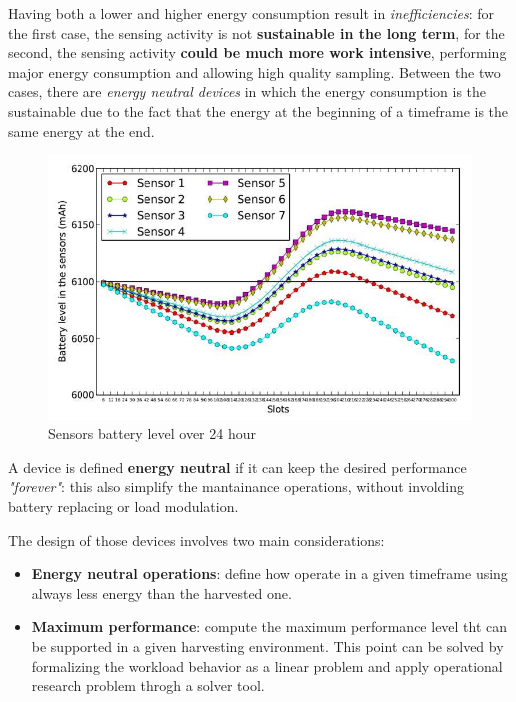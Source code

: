 \documentclass[10pt,a4paper]{report}
\theoremstyle{definition}
\begin{document}
Having both a lower and higher energy consumption result in \textit{inefficiencies}: for the first case, the sensing activity is not \textbf{sustainable in the long term}, for the second, the sensing activity \textbf{could be much more work intensive}, performing major energy consumption and allowing high quality sampling.
Between the two cases, there are \textit{energy neutral devices} in which the energy consumption is the sustainable due to the fact that the energy at the beginning of a timeframe is the same energy at the end.

\begin{figure}[h]
	\centering\includegraphics[scale=0.50]{images/Pasted image 20230509145820.png}
	\caption{Sensors battery level over 24 hour}
	\label{sensor-diagram-neutrality}
\end{figure}

A device is defined \textbf{energy neutral} if it can keep the desired performance \textit{"forever"}: this also simplify the mantainance operations, without involding battery replacing or load modulation.

The design of those devices involves two main considerations:
\begin{itemize}
	\item 
	\textbf{Energy neutral operations}: define how operate in a given timeframe using always less energy than the harvested one.
	\item 
	\textbf{Maximum performance}: compute the maximum performance level tht can be supported in a given harvesting environment. This point can be solved by formalizing the workload behavior as a linear problem and apply operational research problem throgh a solver tool.
\end{itemize}
\end{document}
